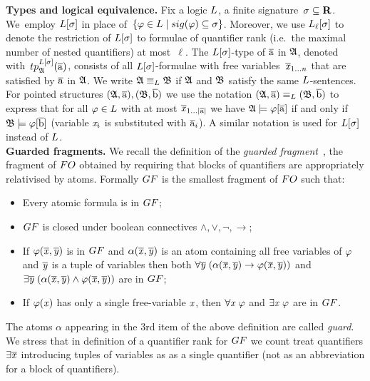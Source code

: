 \noindent \textbf{Types and logical equivalence.}
Fix a logic $\logicL$, a finite signature~$\sigma \subseteq \mathbf{R}$. 
We~employ $\logicL[\sigma]$ in place of~$\{ \varphi \in \logicL \mid \sig(\varphi) \subseteq \sigma \}$.
Moreover, we use $\logicL_\ell[\sigma]$ to denote the restriction of $\logicL[\sigma]$ to formulae of quantifier rank (i.e.\ the maximal number of nested quantifiers) at most~$\ell$.  
%
The $\logicL[\sigma]$-type of $\overline{\mathrm{a}}$ in ${\mathfrak{A}}$, denoted with~$\tp{\logicL[\sigma]}{\str{A}}{\elemtuplea}$, consists of all $\logicL[\sigma]$-formulae with free variables~$\overline{\mathit{x}}_{1\ldots n}$ that are satisfied by $\overline{\mathrm{a}}$ in ${\mathfrak{A}}$.
We write $\str{A} \equiv_\logicL \str{B}$ if ${\mathfrak{A}}$ and ${\mathfrak{B}}$ satisfy the same $\logicL$-sentences.
For pointed structures $({\mathfrak{A}}, \overline{\mathrm{a}}), ({\mathfrak{B}}, \overline{\mathrm{b}})$ we use the notation $(\str{A}, \elemtuplea) \equiv_\logicL (\str{B}, \elemtupleb)$ to express that for all $\varphi \in \logicL$ with at most $\overline{\mathit{x}}_{1\ldots|\overline{\mathrm{a}}|}$ we have ${\mathfrak{A}} \models \varphi[\overline{\mathrm{a}}]$ if and only if ${\mathfrak{B}} \models \varphi[\overline{\mathrm{b}}]$ (variable $\mathit{x}_i$ is substituted with $\overline{\mathrm{a}}_i$). 
A similar notation is used for $\logicL[\sigma]$ instead of $\logicL$.\\

\noindent \textbf{Guarded fragments.}
We recall the definition of the \emph{guarded fragment}~\cite[Sec. 4.1]{AndrekaNB98}, \ie the fragment of $\FO$ obtained by requiring that blocks of quantifiers are appropriately relativised by atoms.
Formally $\GF$ is the smallest fragment of $\FO$  such that:
\begin{itemize}\itemsep0em
    \item Every atomic formula is in $\GF$;
    \item $\GF$ is closed under boolean connectives $\land, \lor, \neg, \to$;
    \item If $\varphi(\overline{\mathit{x}}, \overline{\mathit{y}})$ is in $\GF$ and $\alpha(\overline{\mathit{x}}, \overline{\mathit{y}})$ is an atom containing all free variables of $\varphi$ and $\overline{\mathit{y}}$ is a tuple of variables then both $\forall{\overline{\mathit{y}}} \; (\alpha(\overline{\mathit{x}}, \overline{\mathit{y}}) \to \varphi(\overline{\mathit{x}}, \overline{\mathit{y}}))$ and $\exists{\overline{\mathit{y}}} \; (\alpha(\overline{\mathit{x}}, \overline{\mathit{y}}) \land \varphi(\overline{\mathit{x}}, \overline{\mathit{y}}))$ are in $\GF$; 
    \item If $\varphi(\mathit{x})$ has only a single free-variable $\mathit{x}$, then $\forall{\mathit{x}}\; \varphi$ and $\exists{\mathit{x}}\; \varphi$ are in $\GF$.
\end{itemize}
The atoms $\alpha$ appearing in the 3rd item of the above definition are called \emph{guard}.
We stress that in definition of a quantifier rank for $\GF$ we count treat quantifiers $\exists{\overline{\mathit{x}}}$ introducing tuples of variables as as a single quantifier (not as an abbreviation for a block of quantifiers).

